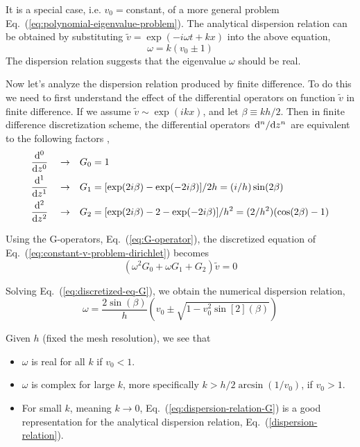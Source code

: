 It is a special case, i.e. $v_0=$constant, of a more general problem Eq.~(\ref{eq:polynomial-eigenvalue-problem}). The analytical dispersion relation can be obtained by substituting $\tilde{v} = \exp(-i\omega t + kx)$ into the above equation,
\begin{equation} \label{dispersion-relation}
	\omega = k(v_0 \pm 1)
\end{equation}
The dispersion relation suggests that the eigenvalue $\omega$ should be real.

Now let's analyze the dispersion relation produced by finite difference. To do this we need to first understand the effect of the differential operators on function $\tilde{v}$ in finite difference. If we assume $\tilde{v}\sim \exp(ikx)$, and let $\beta\equiv kh/2$. Then in finite difference discretization scheme, the differential operators $\dv*[n]{z}$ are equivalent to the following factors \cite{llobet_spectral_1990},
\begin{equation}
	\begin{aligned}
		\dv[0]{z} \quad \to \quad & G_0 = 1                                                              \\
		\dv[1]{z} \quad \to \quad & G_1 = [\exp(2i\beta)-\exp(-2i\beta)]/2h = (i/h)\sin(2\beta)          \\
		\dv[2]{z} \quad \to \quad & G_2 = [\exp(2i\beta)-2-\exp(-2i\beta)]/h^2 = (2/h^2)(\cos(2\beta)-1)
	\end{aligned}
	\label{eq:G-operator}
\end{equation}

Using the G-operators, Eq.~(\ref{eq:G-operator}), the discretized equation of Eq.~(\ref{eq:constant-v-problem-dirichlet}) becomes
\begin{equation} \label{eq:discretized-eq-G}
	(\omega^2G_0 + \omega G_1 + G_2)\tilde{v} = 0
\end{equation}

Solving Eq.~(\ref{eq:discretized-eq-G}), we obtain the numerical dispersion relation,
\begin{equation}
	\omega = \frac{2\sin(\beta)}{h}\left(v_0 \pm \sqrt{1 - v_0^2\sin[2](\beta)}\right)
	\label{eq:dispersion-relation-G}
\end{equation}

Given $h$ (fixed the mesh resolution), we see that
\begin{itemize}
	\item $\omega$ is real for all $k$ if $v_0 < 1$.
	\item $\omega$ is complex for large $k$, more specifically $k>h/2\arcsin(1/v_0)$, if $v_0 > 1$.
	\item For small $k$, meaning $k\to 0$, Eq.~(\ref{eq:dispersion-relation-G}) is a good representation for the analytical dispersion relation, Eq.~(\ref{dispersion-relation}).
\end{itemize}

